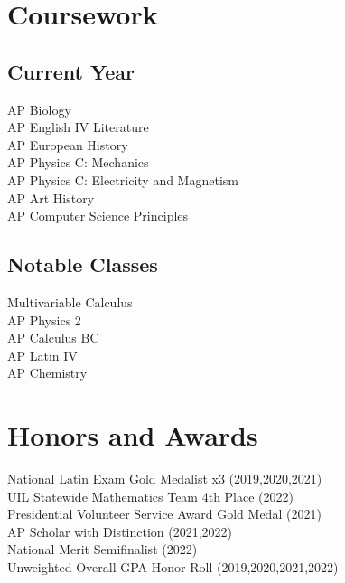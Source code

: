 \documentclass[letterpaper]{kathy-resume} %
\begin{document}
\begin{minipage}[t]{0.35\textwidth}
\sectionspace %


\section{Coursework}

\subsection{Current Year}

AP Biology \\
AP English IV Literature \\
AP European History \\
AP Physics C: Mechanics \\
AP Physics C: Electricity and Magnetism \\
AP Art History \\
AP Computer Science Principles

\sectionspace %

\subsection{Notable Classes}
Multivariable Calculus \\
AP Physics 2 \\
AP Calculus BC \\
AP Latin IV \\
AP Chemistry
\sectionspace

\section{Honors and Awards}
National Latin Exam Gold Medalist x3 (2019,2020,2021)\\
UIL Statewide Mathematics Team 4{th} Place (2022)\\
Presidential Volunteer Service Award Gold Medal (2021)\\
AP Scholar with Distinction (2021,2022)\\
National Merit Semifinalist (2022) \\
Unweighted Overall GPA Honor Roll (2019,2020,2021,2022) 



\end{minipage} %
\end{document}

